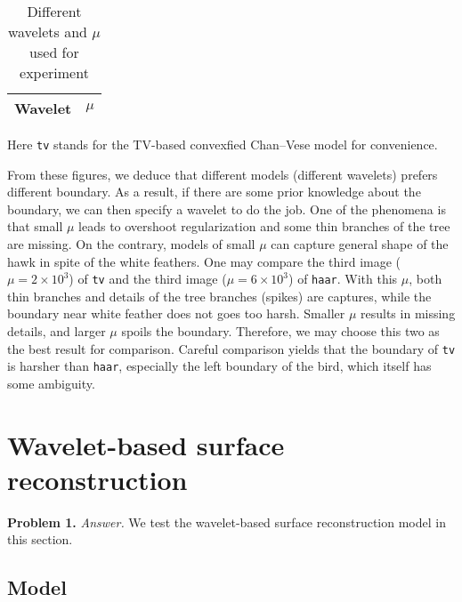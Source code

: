 \documentclass[english, nochinese]{pnote}
\begin{document}
\begin{table}[htbp]
{
\centering
\begin{tabular}{|c|c|c|c|c|c|}
\hline
Wavelet & \multicolumn{5}{c|}{$\mu$} \\
\hline

\end{tabular}
\caption{Different wavelets and $\mu$ used for experiment}
\label{Tbl:Diff}
}
{
\footnotesize Here \verb"tv" stands for the TV-based convexfied Chan--Vese model for convenience.
}
\end{table}

From these figures, we deduce that different models (different wavelets) prefers different boundary. As a result, if there are some prior knowledge about the boundary, we can then specify a wavelet to do the job. One of the phenomena is that small $\mu$ leads to overshoot regularization and some thin branches of the tree are missing. On the contrary, models of small $\mu$ can capture general shape of the hawk in spite of the white feathers. One may compare the third image ($ \mu = 2 \times 10^3 $) of \verb"tv" and the third image ($ \mu = 6 \times 10^3 $) of \verb"haar". With this $\mu$, both thin branches and details of the tree branches (spikes) are captures, while the boundary near white feather does not goes too harsh. Smaller $\mu$ results in missing details, and larger $\mu$ spoils the boundary. Therefore, we may choose this two as the best result for comparison. Careful comparison yields that the boundary of \verb"tv" is harsher than \verb"haar", especially the left boundary of the bird, which itself has some ambiguity.

\section{Wavelet-based surface reconstruction}

\textbf{Problem 1.} \textit{Answer.} We test the wavelet-based surface reconstruction model in this section.

\subsection{Model}
\end{document}
